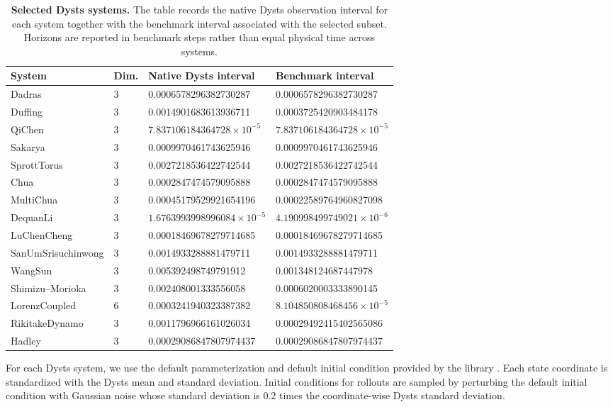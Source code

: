 \begin{table}[ht]
\centering
\scriptsize
\setlength{\tabcolsep}{4pt}
\begin{tabular}{p{}p{}p{}p{}}
\toprule
System & Dim. & Native Dysts interval & Benchmark interval \\
\midrule
Dadras & 3 & 0.0006578296382730287 & 0.0006578296382730287 \\
Duffing & 3 & 0.0014901683613936711 & 0.0003725420903484178 \\
QiChen & 3 & $7.837106184364728 \times 10^{-5}$ & $7.837106184364728 \times 10^{-5}$ \\
Sakarya & 3 & 0.0009970461743625946 & 0.0009970461743625946 \\
SprottTorus & 3 & 0.0027218536422742544 & 0.0027218536422742544 \\
Chua & 3 & 0.0002847474579095888 & 0.0002847474579095888 \\
MultiChua & 3 & 0.00045179529921654196 & 0.00022589764960827098 \\
DequanLi & 3 & $1.6763993998996084 \times 10^{-5}$ & $4.190998499749021 \times 10^{-6}$ \\
LuChenCheng & 3 & 0.00018469678279714685 & 0.00018469678279714685 \\
SanUmSrisuchinwong & 3 & 0.0014933288881479711 & 0.0014933288881479711 \\
WangSun & 3 & 0.005392498749791912 & 0.001348124687447978 \\
Shimizu--Morioka & 3 & 0.002408001333556058 & 0.0006020003333890145 \\
LorenzCoupled & 6 & 0.0003241940323387382 & $8.104850808468456 \times 10^{-5}$ \\
RikitakeDynamo & 3 & 0.0011796966161026034 & 0.00029492415402565086 \\
Hadley & 3 & 0.00029086847807974437 & 0.00029086847807974437 \\
\bottomrule
\end{tabular}
\caption{\textbf{Selected Dysts systems.} The table records the native Dysts observation interval for each system together with the benchmark interval associated with the selected subset. Horizons are reported in benchmark steps rather than equal physical time across systems.}
\label{tab:dysts-systems}
\end{table}

For each Dysts system, we use the default parameterization and default initial condition provided by the library \citep{gilpin_chaos_2021, gilpin_model_2023}. Each state coordinate is standardized with the Dysts mean and standard deviation. Initial conditions for rollouts are sampled by perturbing the default initial condition with Gaussian noise whose standard deviation is $0.2$ times the coordinate-wise Dysts standard deviation.

